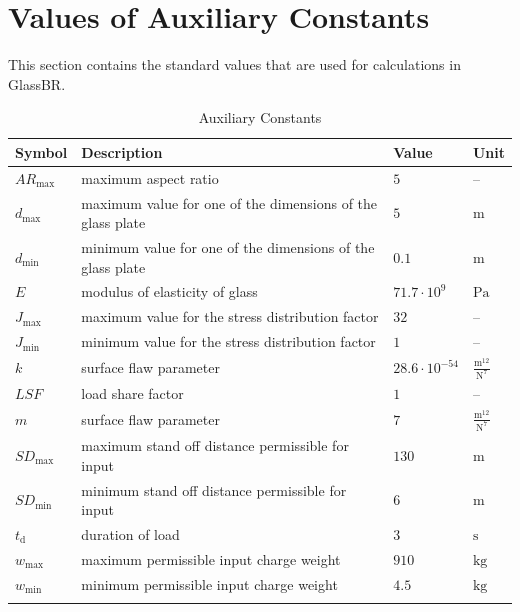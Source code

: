\documentclass[12pt]{article}
\begin{document}
\section{Values of Auxiliary Constants}
\label{Sec:AuxConstants}
This section contains the standard values that are used for calculations in GlassBR.

\begin{longtabu}{l X[l] l l}
\toprule
\textbf{Symbol} & \textbf{Description} & \textbf{Value} & \textbf{Unit}
\\
\midrule
\endhead
${\mathit{AR}_{\text{max}}}$ & maximum aspect ratio & $5$ & --
\\
${d_{\text{max}}}$ & maximum value for one of the dimensions of the glass plate & $5$ & ${\text{m}}$
\\
${d_{\text{min}}}$ & minimum value for one of the dimensions of the glass plate & $0.1$ & ${\text{m}}$
\\
$E$ & modulus of elasticity of glass & $71.7\cdot{}10^{9}$ & ${\text{Pa}}$
\\
${J_{\text{max}}}$ & maximum value for the stress distribution factor & $32$ & --
\\
${J_{\text{min}}}$ & minimum value for the stress distribution factor & $1$ & --
\\
$k$ & surface flaw parameter & $28.6\cdot{}10^{-54}$ & $\frac{\text{m}^{12}}{\text{N}^{7}}$
\\
$\mathit{LSF}$ & load share factor & $1$ & --
\\
$m$ & surface flaw parameter & $7$ & $\frac{\text{m}^{12}}{\text{N}^{7}}$
\\
${\mathit{SD}_{\text{max}}}$ & maximum stand off distance permissible for input & $130$ & ${\text{m}}$
\\
${\mathit{SD}_{\text{min}}}$ & minimum stand off distance permissible for input & $6$ & ${\text{m}}$
\\
${t_{\text{d}}}$ & duration of load & $3$ & ${\text{s}}$
\\
${w_{\text{max}}}$ & maximum permissible input charge weight & $910$ & ${\text{kg}}$
\\
${w_{\text{min}}}$ & minimum permissible input charge weight & $4.5$ & ${\text{kg}}$
\\
\bottomrule
\caption{Auxiliary Constants}
\label{Table:TAuxConsts}
\end{longtabu}
\end{document}
